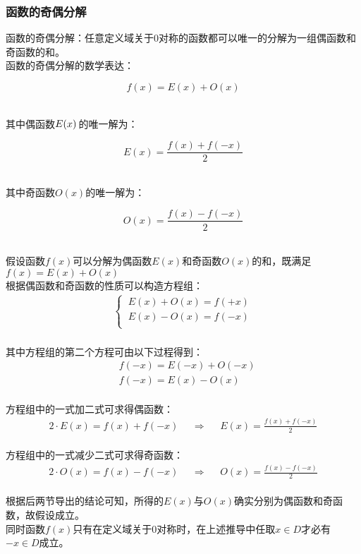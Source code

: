 \documentclass[UTF8]{ctexart}
\begin{document}
\subsubsection{函数的奇偶分解}
    \setcounter{equation}{0}
    函数的奇偶分解：任意定义域关于$0$对称的函数都可以唯一的分解为一组偶函数和奇函数的和。\\[3mm]
    函数的奇偶分解的数学表达：
    \begin{large}
        \begin{equation*}
            f(x)=E(x)+O(x)
        \end{equation*}
    \end{large}\\
    其中偶函数$E(x)\hspace{1.5pt}$的唯一解为：
    \begin{large}
        \begin{equation*}
            E(x)=\frac{f(x)+f(-x)}{2}
        \end{equation*}
    \end{large}\\
    其中奇函数$O(x)$的唯一解为：
    \begin{large}
        \begin{equation*}
            O(x)=\frac{f(x)-f(-x)}{2}
        \end{equation*}
    \end{large}\\
    假设函数$f(x)$可以分解为偶函数$E(x)$和奇函数$O(x)$的和，既满足$f(x)=E(x)+O(x)$\\[3mm]
    根据偶函数和奇函数的性质可以构造方程组：
    \begin{align}
        \begin{cases}
            ~E(x)+O(x)=f(+x)\\[1mm]
            ~E(x)-O(x)=f(-x)\\
        \end{cases}
    \end{align}\\
    其中方程组的第二个方程可由以下过程得到：
    \begin{align}
        &f(-x)=E(-x)+O(-x)\\[5mm]
        &f(-x)=E(x)-O(x)
    \end{align}\\
    方程组中的一式加二式可求得偶函数：
    \begin{align}
        2\cdot E(x)=f(x)+f(-x)~~~~~~\Longrightarrow~~~~~~E(x)=\frac{f(x)+f(-x)}{2}
    \end{align}\\
    方程组中的一式减少二式可求得奇函数：
    \begin{align}
        2\cdot O(x)=f(x)-f(-x)~~~~~~\Longrightarrow~~~~~~O(x)=\frac{f(x)-f(-x)}{2}
    \end{align}\\
    根据后两节导出的结论可知，所得的$E(x)$与$O(x)$确实分别为偶函数和奇函数，故假设成立。\\[3mm]
    同时函数$f(x)$只有在定义域关于$0$对称时，在上述推导中任取$x\in D$才必有$-x\in D$成立。
\end{document}
